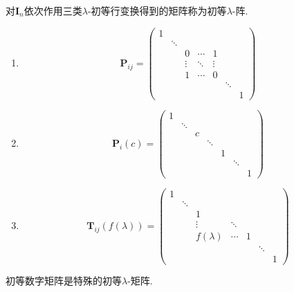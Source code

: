 \begin{formal}
\begin{definition}[初等$\lambda$-阵]\label{def:初等多项式矩阵}
    对$\bm{I}_n$依次作用三类$\lambda$-初等行变换得到的矩阵称为初等$\lambda$-阵.
    \begin{enumerate}[label={\textup{(\arabic*)}}]
        \newpage
        \item \[\bm{P}_{ij}=\begin{pmatrix}
            1&&&&&&\\
            &\ddots&&&&&\\
            &&0&\cdots&1&&\\
            &&\vdots&\ddots&\vdots&&\\
            &&1&\cdots&0&&\\
            &&&&&\ddots&\\
            &&&&&&1
        \end{pmatrix}
        \]
        \item \[
        \bm{P}_i\left(c\right)=\begin{pmatrix}
            1&&&&&&\\
            &\ddots&&&&&\\
            &&c&&&&\\
            &&&\ddots&&&\\
            &&&&1&&\\
            &&&&&\ddots&\\
            &&&&&&1
        \end{pmatrix}
        \]
        \item \[
        \bm{T}_{ij}\left(f\left(\lambda\right)\right)=\begin{pmatrix}
            1&&&&&&\\
            &\ddots&&&&&\\
            &&1&&&&\\
            &&\vdots&\ddots&&&\\
            &&f\left(\lambda\right)&\cdots&1&&\\
            &&&&&\ddots&\\
            &&&&&&1
        \end{pmatrix}
        \]
    \end{enumerate}
\end{definition}
\end{formal}
\begin{red}
    \begin{remark}
        初等数字矩阵是特殊的初等$\lambda$-矩阵.
    \end{remark}
\end{red}
